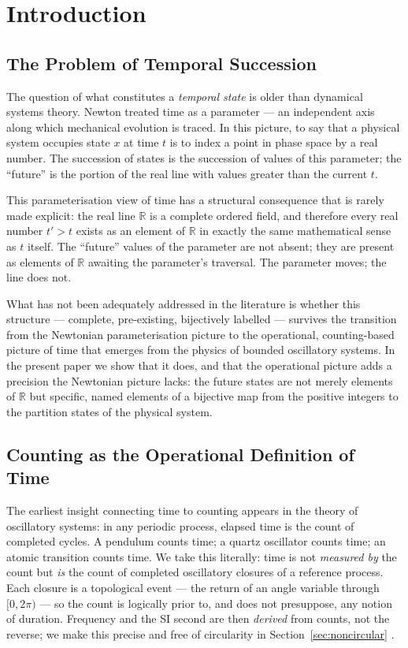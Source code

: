 \documentclass[twocolumn,10pt,a4paper]{article}
\theoremstyle{thmstyle}
\theoremstyle{definition}
\theoremstyle{remark}
\newcommand{\R}{\mathbb{R}}
\begin{document}
\section{Introduction}
\label{sec:introduction}

\subsection{The Problem of Temporal Succession}

The question of what constitutes a \emph{temporal state} is older than dynamical systems theory. Newton treated time as a parameter --- an independent axis along which mechanical evolution is traced. In this picture, to say that a physical system occupies state $x$ at time $t$ is to index a point in phase space by a real number. The succession of states is the succession of values of this parameter; the ``future'' is the portion of the real line with values greater than the current $t$.

This parameterisation view of time has a structural consequence that is rarely made explicit: the real line $\R$ is a complete ordered field, and therefore every real number $t' > t$ exists as an element of $\R$ in exactly the same mathematical sense as $t$ itself. The ``future'' values of the parameter are not absent; they are present as elements of $\R$ awaiting the parameter's traversal. The parameter moves; the line does not.

What has not been adequately addressed in the literature is whether this structure --- complete, pre-existing, bijectively labelled --- survives the transition from the Newtonian parameterisation picture to the operational, counting-based picture of time that emerges from the physics of bounded oscillatory systems. In the present paper we show that it does, and that the operational picture adds a precision the Newtonian picture lacks: the future states are not merely elements of $\R$ but specific, named elements of a bijective map from the positive integers to the partition states of the physical system.

\subsection{Counting as the Operational Definition of Time}

The earliest insight connecting time to counting appears in the theory of oscillatory systems: in any periodic process, elapsed time is the count of completed cycles. A pendulum counts time; a quartz oscillator counts time; an atomic transition counts time. We take this literally: time is not \emph{measured by} the count but \emph{is} the count of completed oscillatory closures of a reference process. Each closure is a topological event --- the return of an angle variable through $[0,2\pi)$ --- so the count is logically prior to, and does not presuppose, any notion of duration. Frequency and the SI second are then \emph{derived} from counts, not the reverse; we make this precise and free of circularity in Section~\ref{sec:noncircular} \citep{planck1900,birkhoff1931,landau1976}.
\end{document}
